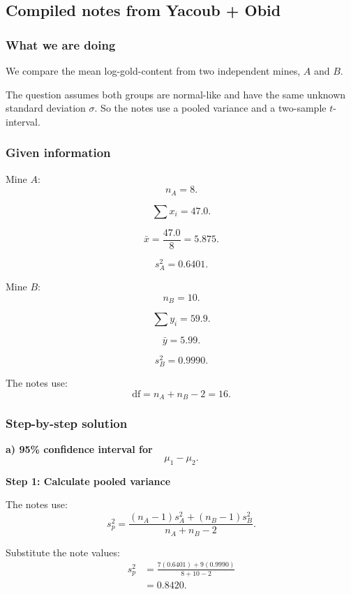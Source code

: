 \documentclass[10pt]{article}
\begin{document}
\subsection*{Compiled notes from Yacoub + Obid}

\subsubsection*{What we are doing}

We compare the mean log-gold-content from two
independent mines, \(A\) and \(B\).

The question assumes both groups are normal-like and
have the same unknown standard deviation \(\sigma\).
So the notes use a pooled variance and a two-sample
\(t\)-interval.

\subsubsection*{Given information}

Mine \(A\):
\[
n_A=8.
\]

\[
\sum x_i=47.0.
\]

\[
\bar{x}
=
\frac{47.0}{8}
=5.875.
\]

\[
s_A^2=0.6401.
\]

Mine \(B\):
\[
n_B=10.
\]

\[
\sum y_i=59.9.
\]

\[
\bar{y}
=5.99.
\]

\[
s_B^2=0.9990.
\]

The notes use:
\[
\text{df}=n_A+n_B-2=16.
\]

\subsubsection*{Step-by-step solution}

\textbf{a) 95\% confidence interval for}
\[
\mu_1-\mu_2.
\]

\textbf{Step 1: Calculate pooled variance}

The notes use:
\[
s_p^2
=
\frac{
(n_A-1)s_A^2+(n_B-1)s_B^2
}{
n_A+n_B-2
}.
\]

Substitute the note values:
\begin{align*}
s_p^2
&=
\frac{
7(0.6401)+9(0.9990)
}{
8+10-2
}
\\[2mm]
&=
0.8420.
\end{align*}
\end{document}
